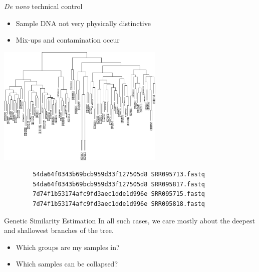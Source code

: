 \documentclass[t]{beamer}
\begin{document}
\begin{frame}[fragile]{\textit{De novo} technical control}
  \begin{itemize}
    \item Sample DNA not very physically distinctive
    \item Mix-ups and contamination occur
  \end{itemize}
  \begin{center}
    \includegraphics[width=0.6\textwidth]{img/at80-tree.png}
  \end{center}
  \pause
  \begin{center}
    \begingroup
      \fontsize{7pt}{7pt}\selectfont
      \begin{verbatim}
        54da64f0343b69bcb959d33f127505d8 SRR095713.fastq
        54da64f0343b69bcb959d33f127505d8 SRR095817.fastq
        7d74f1b53174afc9fd3aec1dde1d996e SRR095715.fastq
        7d74f1b53174afc9fd3aec1dde1d996e SRR095818.fastq
      \end{verbatim}
    \endgroup
  \end{center}
\end{frame}

\begin{frame}[c]{Genetic Similarity Estimation}
  \centering In all such cases, we care mostly about the deepest and shallowest
  branches of the tree.
  \medskip
  \begin{itemize}
    \item \small{Which groups are my samples in?}
    \item \small{Which samples can be collapsed?}
  \end{itemize}
\end{frame}
\end{document}
